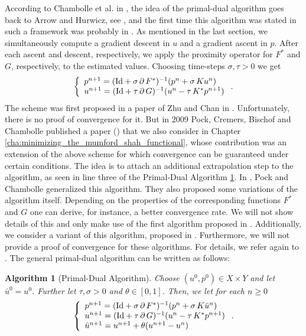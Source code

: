 \documentclass[abstracton]{scrreprt}
\newtheorem{algorithm}[theorem]{Algorithm}
\begin{document}
        According to Chambolle et al. in \cite{Chambolle-et-al-10}, the idea of the primal-dual algorithm goes back to Arrow and Hurwicz, see \cite{Arrow-Hurwicz}, and the first time this algorithm was stated in such a framework was probably in \cite{Appleton-Talbot}. As mentioned in the last section, we simultaneously compute a gradient descent in $u$ and a gradient ascent in $p$. After each ascent and descent, respectively, we apply the proximity operator for $F^{\ast}$ and $G$, respectively, to the estimated values. Choosing time-steps $\sigma, \tau > 0$ we get
            $$
                \left\{ 
                    \begin{array}{l l}
                        p^{n+1} = (\textnormal{Id} + \sigma\,\partial\,F^{\ast})^{-1}(p^{n} + \sigma\,Ku^{n})\\
                        u^{n+1} = (\textnormal{Id} + \tau\,\partial\,G)^{-1}(u^{n} - \tau\,K^{\ast}p^{n+1})
                  \end{array}
                \right. .
            $$
        The scheme was first proposed in a paper of Zhu and Chan in \cite{Zhu-Chan}. Unfortunately, there is no proof of convergence for it. But in 2009 Pock, Cremers, Bischof and Chambolle published a paper (\cite{Pock-et-al-iccv09}) that we also consider in Chapter \ref{cha:minimizing_the_mumford_shah_functional}, whose contribution was an extension of the above scheme for which convergence can be guaranteed under certain conditions. The idea is to attach an additional extrapolation step to the algorithm, as seen in line three of the Primal-Dual Algorithm \ref{alg:primal_dual_algorithm}. In \cite{Chambolle10afirst-order}, Pock and Chambolle generalized this algorithm. They also proposed some variations of the algorithm itself. Depending on the properties of the corresponding functions $F^{\ast}$ and $G$ one can derive, for instance, a better convergence rate. We will not show details of this and only make use of the first algorithm proposed in \cite{Chambolle10afirst-order}. Additionally, we consider a variant of this algorithm, proposed in \cite{Strekalovskiy-Cremers-eccv14}. Furthermore, we will not provide a proof of convergence for these algorithms. For details, we refer again to \cite{Chambolle10afirst-order}. The general primal-dual algorithm can be written as follows:
        \begin{algorithm}[Primal-Dual Algorithm]
        \label{alg:primal_dual_algorithm}
            Choose $(u^{0}, p^{0}) \in X \times Y$ and let $\bar{u}^{0} = u^{0}$. Further let $\tau, \sigma > 0$ and $\theta \in [0, 1]$. Then, we let for each $n \ge 0$
                $$
                    \left\{ 
                        \begin{array}{l l}
                            p^{n+1} = (\textnormal{Id} + \sigma\,\partial\,F^{\ast})^{-1}(p^{n} + \sigma\,K\bar{u}^{n}) \\
                            u^{n+1} = (\textnormal{Id} + \tau\,\partial\,G)^{-1}(u^{n} - \tau\,K^{\ast}p^{n+1}) \\
                            \bar{u}^{n+1} = u^{n+1} + \theta (u^{n+1} - u^{n})
                        \end{array}
                    \right. .
                $$
        \end{algorithm}
\end{document}
